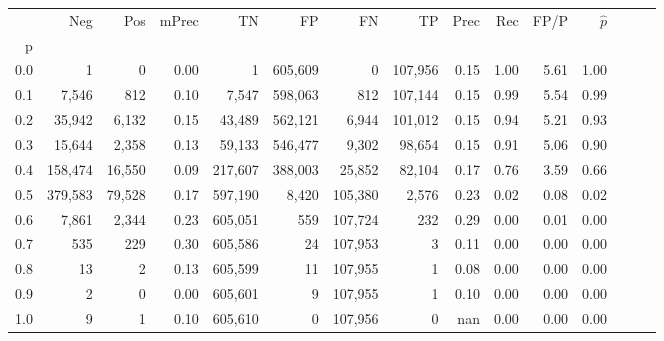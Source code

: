 \begin{tabular}{rrrrrrrrrrrrrrr}
\toprule
{} &      Neg &     Pos & mPrec &       TN &       FP &       FN &       TP &  Prec &   Rec &  FP/P & $\hat{p}$ \\
p   &          &         &       &          &          &          &          &       &       &       &           \\
\midrule
0.0 &        1 &       0 &  0.00 &        1 &  605,609 &        0 &  107,956 &  0.15 &  1.00 &  5.61 &      1.00 \\
0.1 &    7,546 &     812 &  0.10 &    7,547 &  598,063 &      812 &  107,144 &  0.15 &  0.99 &  5.54 &      0.99 \\
0.2 &   35,942 &   6,132 &  0.15 &   43,489 &  562,121 &    6,944 &  101,012 &  0.15 &  0.94 &  5.21 &      0.93 \\
0.3 &   15,644 &   2,358 &  0.13 &   59,133 &  546,477 &    9,302 &   98,654 &  0.15 &  0.91 &  5.06 &      0.90 \\
0.4 &  158,474 &  16,550 &  0.09 &  217,607 &  388,003 &   25,852 &   82,104 &  0.17 &  0.76 &  3.59 &      0.66 \\
0.5 &  379,583 &  79,528 &  0.17 &  597,190 &    8,420 &  105,380 &    2,576 &  0.23 &  0.02 &  0.08 &      0.02 \\
0.6 &    7,861 &   2,344 &  0.23 &  605,051 &      559 &  107,724 &      232 &  0.29 &  0.00 &  0.01 &      0.00 \\
0.7 &      535 &     229 &  0.30 &  605,586 &       24 &  107,953 &        3 &  0.11 &  0.00 &  0.00 &      0.00 \\
0.8 &       13 &       2 &  0.13 &  605,599 &       11 &  107,955 &        1 &  0.08 &  0.00 &  0.00 &      0.00 \\
0.9 &        2 &       0 &  0.00 &  605,601 &        9 &  107,955 &        1 &  0.10 &  0.00 &  0.00 &      0.00 \\
1.0 &        9 &       1 &  0.10 &  605,610 &        0 &  107,956 &        0 &   nan &  0.00 &  0.00 &      0.00 \\
\bottomrule
\end{tabular}
